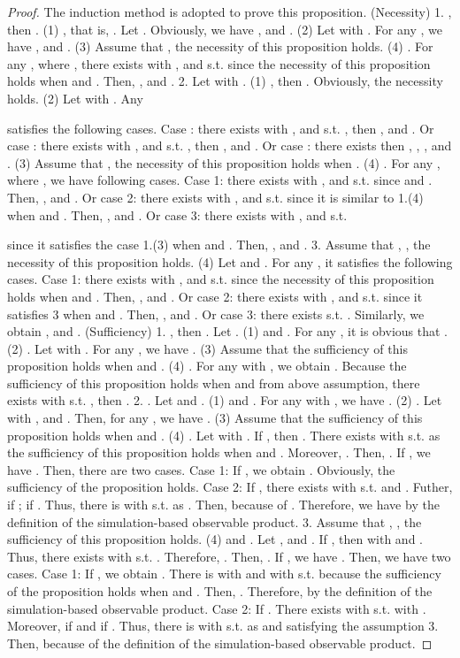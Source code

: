 \documentclass[12pt,draftcls,onecolumn]{IEEEtran}
\begin{document}
\begin{proof}
The induction method is adopted to prove this proposition.
(Necessity) 1. , then . (1) , that is,
. Let . Obviously, we have ,  and . (2) Let
 with . For any , we have
,  and . (3) Assume that , the necessity
of this proposition holds. (4) . For any , where
, there exists  with ,  and  s.t.  since the
necessity of this proposition holds when  and
. Then, ,  and . 2. Let  with . (1) , then . Obviously, the
necessity holds. (2) Let  with . Any

satisfies the following cases. Case : there exists  with ,  and
 s.t. , then
,  and . Or case : there
exists  with ,  and  s.t. , then
,  and . Or case : there
exists  then , , ,  and . (3) Assume that
, the necessity of this proposition holds when .
(4) . For any , where , we have following cases. Case 1: there
exists  with ,  and  s.t.  since  and
. Then,
,  and . Or case 2: there exists  with ,  and
 s.t.  since it is similar to 1.(4) when
 and . Then,
,  and
. Or case 3: there exists  with ,  and  s.t.

since it satisfies the case 1.(3) when  and
. Then,
,  and . 3. Assume that , , the
necessity of this proposition holds. (4) Let  and
. For any , it satisfies the following cases. Case 1: there
exists  with ,  and  s.t.  since the
necessity of this proposition holds when  and . Then, ,  and . Or case 2:
there exists  with ,  and  s.t.
 since it satisfies 3 when  and . Then, ,  and . Or case 3:
there exists  s.t. .
Similarly, we obtain ,  and
. (Sufficiency) 1. , then
. Let . (1)  and
. For any , it is
obvious that . (2) . Let  with
. For any ,
we have . (3) Assume that the sufficiency of this proposition
holds when  and . (4) . For any  with
, we obtain . Because
the sufficiency of this proposition holds when  and
 from above assumption,
there exists  with  s.t. , then . 2.
. Let  and . (1)
 and . For any  with , we have
.
(2) . Let  with ,
 and . Then, for
any , we have . (3) Assume that
the sufficiency of this proposition holds when  and
. (4) . Let  with
.
If , then . There exists  with  s.t.  as the
sufficiency of this proposition holds when  and
. Moreover, . Then, . If
, we have
. Then,
there are two cases. Case 1: If
, we obtain . Obviously, the sufficiency of
the proposition holds. Case 2: If , there
exists  with  s.t.
 and .
Futher,  if ;  if . Thus, there is
 with  s.t.  as . Then,  because of . Therefore, we
have  by
the definition of the simulation-based observable product. 3.
Assume that , , the sufficiency of this
proposition holds. (4)  and . Let ,  and . If
, then  with  and
. Thus, there exists  with  s.t.
. Therefore, . Then, . If , we have .
Then, we have two cases. Case 1: If , we
obtain . There is  with  and  with  s.t. 
because the sufficiency of the proposition holds when  and . Then, .
Therefore,  by
the definition of the simulation-based observable product. Case 2:
If . There exists  with  s.t.  with . Moreover,  if  and
 if . Thus, there is  with  s.t.  as
 and  satisfying the assumption 3. Then,  because of the definition of
the simulation-based observable product.
\end{proof}
\end{document}
